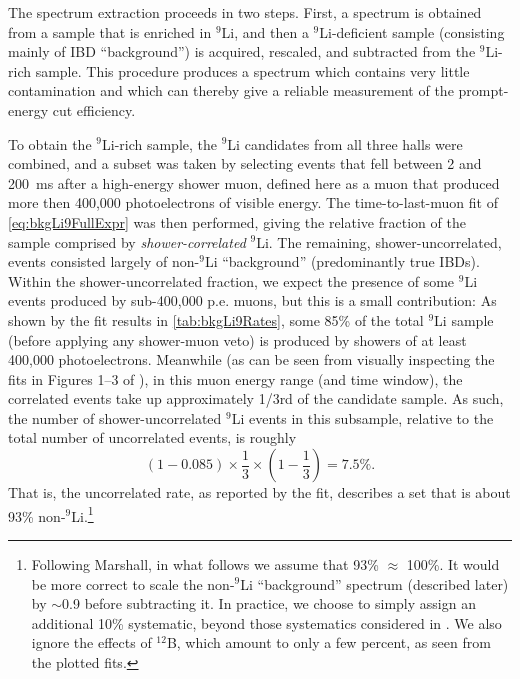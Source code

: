 \documentclass[../thesis.tex]{subfiles}
\begin{document}
The spectrum extraction proceeds in two steps. First, a spectrum is obtained from a sample that is enriched in $^9$Li, and then a $^9$Li-deficient sample (consisting mainly of IBD ``background'') is acquired, rescaled, and subtracted from the $^9$Li-rich sample. This procedure produces a spectrum which contains very little contamination and which can thereby give a reliable measurement of the prompt-energy cut efficiency.

To obtain the $^9$Li-rich sample, the $^9$Li candidates from all three halls were combined, and a subset was taken by selecting events that fell between 2 and 200~ms after a high-energy shower muon, defined here as a muon that produced more then 400,000 photoelectrons of visible energy. The time-to-last-muon fit of \autoref{eq:bkgLi9FullExpr} was then performed, giving the relative fraction of the sample comprised by \emph{shower-correlated} $^9$Li. The remaining, shower-uncorrelated, events consisted largely of non-$^9$Li ``background'' (predominantly true IBDs). Within the shower-uncorrelated fraction, we expect the presence of some $^9$Li events produced by sub-400,000 p.e. muons, but this is a small contribution: As shown by the fit results in \autoref{tab:bkgLi9Rates}, some 85\% of the total $^9$Li sample (before applying any shower-muon veto) is produced by showers of at least 400,000 photoelectrons. Meanwhile (as can be seen from visually inspecting the fits in Figures 1--3 of \cite{ChrisLi9}), in this muon energy range (and time window), the correlated events take up approximately 1/3rd of the candidate sample. As such, the number of shower-uncorrelated $^9$Li events in this subsample, relative to the total number of uncorrelated events, is roughly
\[(1 - 0.085)\times\frac{1}{3}\times\left( 1 - \frac{1}{3} \right) = 7.5\%.\]
That is, the uncorrelated rate, as reported by the fit, describes a set that is about 93\% non-$^9$Li.\footnote{Following Marshall, in what follows we assume that 93\% $\approx$ 100\%. It would be more correct to scale the non-$^9$Li ``background'' spectrum (described later) by $\sim$0.9 before subtracting it. In practice, we choose to simply assign an additional 10\% systematic, beyond those systematics considered in \cite{ChrisLi9}. We also ignore the effects of $^{12}$B, which amount to only a few percent, as seen from the plotted fits.}
\end{document}
